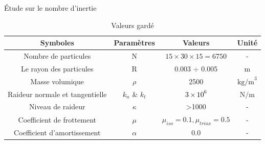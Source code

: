 \documentclass[10pt]{beamer}
\begin{document}
\begin{frame}{Étude sur le nombre d'inertie}
    \begin{table}
        \centering
        \begin{tabular}{|c|c|c|c|}
            \hline
            \textbf{Symboles}               & \textbf{Paramètres} & \textbf{Valeurs}                      & \textbf{Unité}  \\
            \hline
            Nombre de particules            & N                   & $15 \times 30 \times 15 = 6750$       & -               \\
            \hline
            Le rayon des particules         & R                   & 0.003 $\div$ 0.005                    & m               \\
            \hline
            Masse volumique                 & $\rho$              & 2500                                  & $\text{kg/m}^3$ \\
            \hline
            Raideur normale et tangentielle & $k_n$ \& $k_t$      & \textcolor{black}{$3 \times 10^6$}    & $\text{N/m}$    \\
            \hline
            Niveau de raideur               & $\kappa$            & >1000                                 & -               \\
            \hline
            Coefficient de frottement       & $\mu$               & $\mu_{iso} = 0.1, \mu_{triax} = 0.5 $ & -               \\
            \hline
            Coefficient d'amortissement     & $\alpha$            & 0.0                                   & -               \\
            \hline
        \end{tabular}
        \caption{Valeurs gardé}
    \end{table}
\end{frame}
\end{document}
